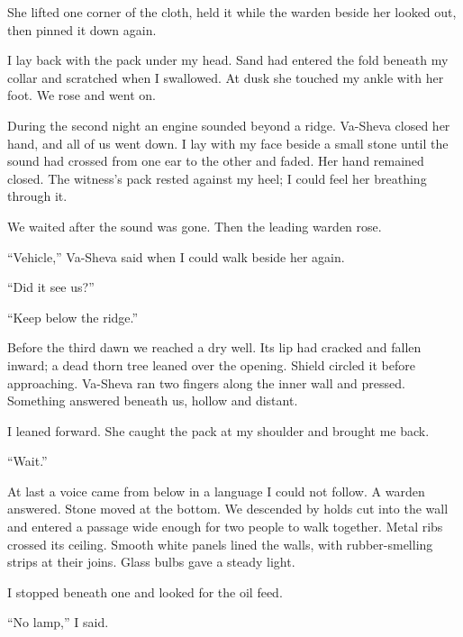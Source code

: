 She lifted one corner of the cloth, held it while the warden beside her looked out, then pinned it down again.\par

I lay back with the pack under my head. Sand had entered the fold beneath my collar and scratched when I swallowed. At dusk she touched my ankle with her foot. We rose and went on.\par

During the second night an engine sounded beyond a ridge. Va-Sheva closed her hand, and all of us went down. I lay with my face beside a small stone until the sound had crossed from one ear to the other and faded. Her hand remained closed. The witness's pack rested against my heel; I could feel her breathing through it.\par

We waited after the sound was gone. Then the leading warden rose.\par

``Vehicle,'' Va-Sheva said when I could walk beside her again.\par

``Did it see us?''\par

``Keep below the ridge.''\par

Before the third dawn we reached a dry well. Its lip had cracked and fallen inward; a dead thorn tree leaned over the opening. Shield circled it before approaching. Va-Sheva ran two fingers along the inner wall and pressed. Something answered beneath us, hollow and distant.\par

I leaned forward. She caught the pack at my shoulder and brought me back.\par

``Wait.''\par

At last a voice came from below in a language I could not follow. A warden answered. Stone moved at the bottom. We descended by holds cut into the wall and entered a passage wide enough for two people to walk together. Metal ribs crossed its ceiling. Smooth white panels lined the walls, with rubber-smelling strips at their joins. Glass bulbs gave a steady light.\par

I stopped beneath one and looked for the oil feed.\par

``No lamp,'' I said.\par

